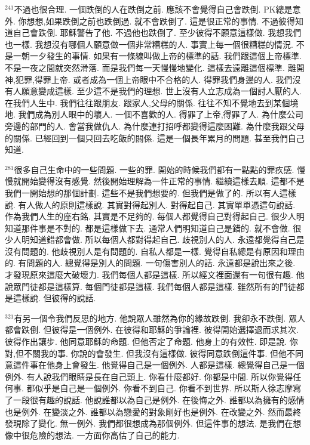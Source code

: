 \documentclass{book}
\begin{document}
$^{241}$不過也很合理.
一個跌倒的人在跌倒之前.
應該不會覺得自己會跌倒.
PK總是意外.
你想想,如果跌倒之前也跌倒過.
就不會跌倒了.
這是很正常的事情.
不過彼得知道自己會跌倒.
耶穌警告了他.
不過他也跌倒了.
至少彼得不願意這樣做.
我想我們也一樣.
我想沒有哪個人願意做一個非常糟糕的人.
事實上每一個很糟糕的情況.
不是一朝一夕發生的事情.
如果有一條線叫做上帝的標準的話.
我們跟這個上帝標準.
不是一夜之間就突然滑落.
而是我們每一天慢慢地變化.
這樣去遠離這個標準.
離開神,犯罪,得罪上帝.
或者成為一個上帝眼中不合格的人.
得罪我們身邊的人.
我們沒有人願意變成這樣.
至少這不是我們的理想.
世上沒有人立志成為一個討人厭的人.
在我們人生中.
我們往往跟朋友.
跟家人,父母的關係.
往往不知不覺地去到某個境地.
我們成為別人眼中的壞人.
一個不喜歡的人.
得罪了上帝,得罪了人.
為什麼公司旁邊的部門的人.
會當我做仇人.
為什麼連打招呼都變得這麼困難.
為什麼我跟父母的關係.
已經回到一個只回去吃飯的關係.
這是一個長年累月的問題.
甚至我們自己知道.

$^{281}$很多自己生命中的一些問題.
一些的罪.
開始的時候我們都有一點點的罪疚感.
慢慢就開始變得沒有感覺.
然後開始理解為一件正常的事情.
繼續這樣去順.
這都不是我們一開始想的那個計劃.
這些不是我們想要的.
但我們是做了的.
所以有人這樣說.
有人做人的原則這樣說.
其實對得起別人.
對得起自己.
其實單單憑這句說話.
作為我們人生的座右銘.
其實是不足夠的.
每個人都覺得自己對得起自己.
很少人明知道那件事是不對的.
都是這樣做下去.
通常人們明知道自己是錯的.
就不會做.
很少人明知道錯都會做.
所以每個人都對得起自己.
歧視別人的人.
永遠都覺得自己是沒有問題的.
他歧視別人是有問題的.
自私人都是一樣.
覺得自私總是有原因和理由的.
有問題的人.
總覺得是別人的問題.
一句傷害別人的話.
永遠都是說出來之後.
才發現原來這麼大破壞力.
我們每個人都是這樣.
所以經文裡面還有一句很有趣.
他說眾門徒都是這樣算.
每個門徒都是這樣.
我們每個人都是這樣.
雖然所有的門徒都是這樣說.
但彼得的說話.

$^{321}$有另一個令我們反思的地方.
他說眾人雖然為你的緣故跌倒.
我卻永不跌倒.
眾人都會跌倒.
但彼得是一個例外.
在彼得和耶穌的爭論裡.
彼得開始選擇退而求其次.
彼得作出讓步.
他同意耶穌的命題.
但他否定了命題.
他身上的有效性.
即是說.
你對,但不關我的事.
你說的會發生.
但我沒有這樣做.
彼得同意跌倒這件事.
但他不同意這件事在他身上會發生.
他覺得自己是一個例外.
人都是這樣.
總覺得自己是一個例外.
有人說我們眼睛是長在自己頭上.
你看什麼都好.
你都是中間.
所以你覺得任何事.
都似乎是自己是一個例外.
你看不到自己.
你看不到世界.
所以斯人徐志摩寫了一段很有趣的說話.
他說誰都以為自己是例外.
在後悔之外.
誰都以為擁有的感情也是例外.
在變淡之外.
誰都以為戀愛的對象剛好也是例外.
在改變之外.
然而最終發現除了變化.
無一例外.
我們都很想成為那個例外.
但這件事的想法.
是我們在想像中很危險的想法.
一方面你高估了自己的能力.
\end{document}
